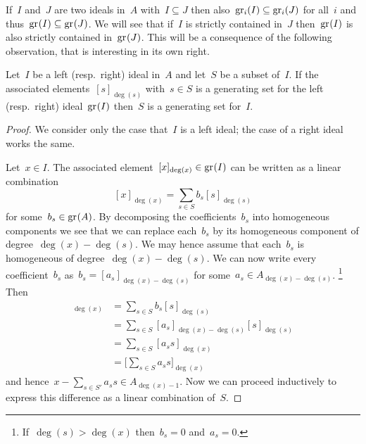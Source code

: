 If~$I$ and~$J$ are two ideals in~$A$ with~$I \subseteq J$ then also~$\gr[i](I) \subseteq \gr[i](J)$ for all~$i$ and thus~$\gr(I) \subseteq \gr(J)$.
We will see that if~$I$ is strictly contained in~$J$ then~$\gr(I)$ is also strictly contained in~$\gr(J)$.
This will be a consequence of the following observation, that is interesting in its own right.

\begin{proposition}
  \label{pulled back generating set}
  Let~$I$ be a left (resp.\ right) ideal in~$A$ and let~$S$ be a subset of~$I$.
  If the associated elements~$[s]_{\deg(s)}$ with~$s \in S$ is a generating set for the left (resp.\ right) ideal~$\gr(I)$ then~$S$ is a generating set for~$I$.
\end{proposition}

\begin{proof}
  We consider only the case that~$I$ is a left ideal;
  the case of a right ideal works the same.
  
  Let~$x \in I$.
  The associated element~$[x]_{\deg(x)} \in \gr(I)$ can be written as a linear combination
  \[
    [x]_{\deg(x)}
    =
    \sum_{s \in S} b_s [s]_{\deg(s)}
  \]
  for some~$b_s \in \gr(A)$.
  By decomposing the coefficients~$b_s$ into homogeneous components we see that we can replace each~$b_s$ by its homogeneous component of degree~$\deg(x) - \deg(s)$.
  We may hence assume that each~$b_s$ is homogeneous of degree~$\deg(x) - \deg(s)$.
  We can now write every coefficient~$b_s$ as~$b_s = [a_s]_{\deg(x) - \deg(s)}$ for some~$a_s \in A_{\deg(x) - \deg(s)}$.%
  \footnote{If~$\deg(s) > \deg(x)$ then~$b_s = 0$ and~$a_s = 0$.}
  Then
  \begin{align*}
    [x]_{\deg(x)}
    &=
    \sum_{s \in S} b_s [s]_{\deg(s)}
    \\
    &=
    \sum_{s \in S} [a_s]_{\deg(x) - \deg(s)} [s]_{\deg(s)}
    \\
    &=
    \sum_{s \in S} [a_s s]_{\deg(x)}
    \\
    &=
    \Biggl[ \sum_{s \in S} a_s s \Biggr]_{\deg(x)}
  \end{align*}
  and hence~$x - \sum_{s \in S'} a_s s \in A_{\deg(x) - 1}$.
  Now we can proceed inductively to express this difference as a linear combination of~$S$.
\end{proof}


